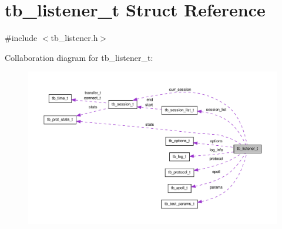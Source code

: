 \hypertarget{structtb__listener__t}{\section{tb\-\_\-listener\-\_\-t Struct Reference}
\label{structtb__listener__t}
}


{\ttfamily \#include $<$tb\-\_\-listener.\-h$>$}



Collaboration diagram for tb\-\_\-listener\-\_\-t\-:\nopagebreak
\begin{figure}[H]
\begin{center}
\leavevmode
\includegraphics[width=350pt]{structtb__listener__t__coll__graph}
\end{center}
\end{figure}
